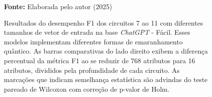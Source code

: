 \begin{figure}
\caption{Resultados do desempenho F1 dos circuitos 7 ao 11 com diferentes tamanhos de vetor de entrada na base \textit{ChatGPT} - Fácil. Esses modelos implementam diferentes formas de emaranhamento quântico. As barras comparativas do lado direito exibem a diferença percentual da métrica F1 ao se reduzir de 768 atributos para 16 atributos, divididos pela profundidade de cada circuito. As marcações que indicam semelhança estatística são advindas do teste pareado de Wilcoxon com correção de p-valor de Holm.}
\label{fig:n_features:easy:g2}
     \centering
    \centering
      \par\medskip\ABNTEXfontereduzida\selectfont\textbf{Fonte:} Elaborada pelo autor (2025) \par\medskip
\end{figure}